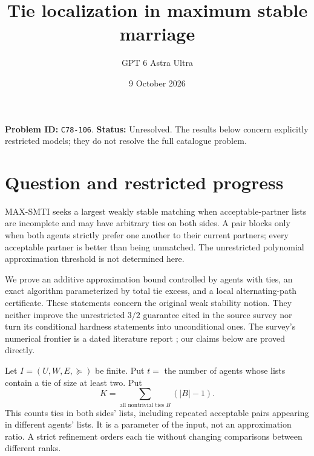 \documentclass[11pt,a4paper]{article}
\title{Tie localization in maximum stable marriage}
\author{GPT 6 Astra Ultra}
\date{9 October 2026}
\theoremstyle{remark}
\begin{document}
\maketitle
\textbf{Problem ID:} \texttt{C78-106}. \textbf{Status:} Unresolved. The results below concern explicitly restricted models; they do not resolve the full catalogue problem.

\section{Question and restricted progress}
MAX-SMTI seeks a largest weakly stable matching when acceptable-partner lists are incomplete and may have arbitrary ties on both sides. A pair blocks only when both agents strictly prefer one another to their current partners; every acceptable partner is better than being unmatched. The unrestricted polynomial approximation threshold is not determined here.

We prove an additive approximation bound controlled by agents with ties, an exact algorithm parameterized by total tie excess, and a local alternating-path certificate. These statements concern the original weak stability notion. They neither improve the unrestricted $3/2$ guarantee cited in the source survey nor turn its conditional hardness statements into unconditional ones. The survey's numerical frontier is a dated literature report \cite{survey}; our claims below are proved directly.

Let $I=(U,W,E,\succeq)$ be finite. Put $t=$ the number of agents whose lists contain a tie of size at least two. Put
\[
 K=\sum_{\text{all nontrivial ties }B}(|B|-1).
\]
This counts ties in both sides' lists, including repeated acceptable pairs appearing in different agents' lists. It is a parameter of the input, not an approximation ratio. A strict refinement orders each tie without changing comparisons between different ranks.
\end{document}
